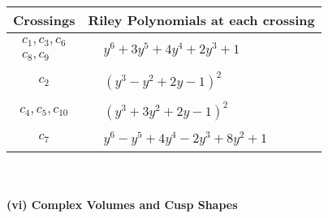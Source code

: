 \documentclass[1p]{elsarticle_modified}
\theoremstyle{definition}
\begin{document}
\begin{tabular}{m{50pt}|m{274pt}}
Crossings & \hspace{64pt}Riley Polynomials at each crossing \\
\hline $$\begin{aligned}c_{1},c_{3},c_{6}\\c_{8},c_{9}\end{aligned}$$&$\begin{aligned}
&y^6+3 y^5+4 y^4+2 y^3+1
\end{aligned}$\\
\hline $$\begin{aligned}c_{2}\end{aligned}$$&$\begin{aligned}
&(y^3- y^2+2 y-1)^2
\end{aligned}$\\
\hline $$\begin{aligned}c_{4},c_{5},c_{10}\end{aligned}$$&$\begin{aligned}
&(y^3+3 y^2+2 y-1)^2
\end{aligned}$\\
\hline $$\begin{aligned}c_{7}\end{aligned}$$&$\begin{aligned}
&y^6- y^5+4 y^4-2 y^3+8 y^2+1
\end{aligned}$\\
\hline
\end{tabular}\\~\\
\newpage\flushleft \textbf{(vi) Complex Volumes and Cusp Shapes}
\end{document}
